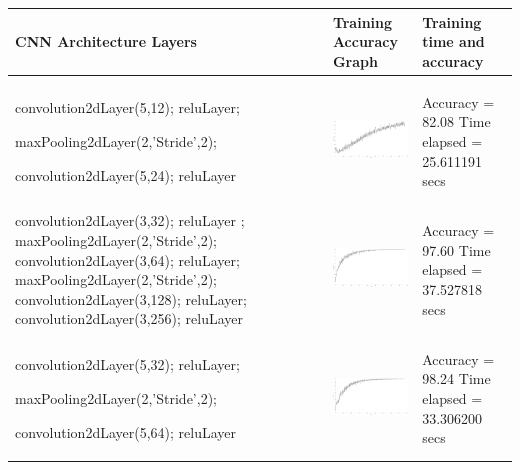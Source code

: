 \begin{table}[!htpb]
	\centering
	\begin{tabular}[t]{|>{\centering}p{6 cm}|p{4.8cm}|p{5.1cm}|}
		
		\cellcolor{blue!25}CNN Architecture Layers & \cellcolor{blue!25} Training Accuracy Graph& \cellcolor{blue!25} Training time and accuracy \\ \hline
		
			&&\\
		\vspace*{-2.8cm}
	convolution2dLayer(5,12);
	reluLayer;
	
	maxPooling2dLayer(2,'Stride',2);
	
	convolution2dLayer(5,24);
	reluLayer &  \includegraphics[height=3cm, width=4.4cm]{Exercise3/Report/accuracy_1_82} &  Accuracy = 82.08 \newline Time elapsed = 25.611191 secs\\ \hline
		
		&&\\
		\vspace*{-2.8cm}
	convolution2dLayer(3,32); reluLayer ; 	maxPooling2dLayer(2,'Stride',2); convolution2dLayer(3,64); reluLayer; maxPooling2dLayer(2,'Stride',2); convolution2dLayer(3,128); reluLayer;	
	convolution2dLayer(3,256);	reluLayer&  \includegraphics[height=3cm, width=4.4cm]{Exercise3/Report/accuracy_5_97_60} &  Accuracy = 97.60 \newline Time elapsed = 37.527818 secs\\ \hline
		
		&&\cellcolor{green!25} \\
		\vspace*{-2.8cm}
		convolution2dLayer(5,32);
		reluLayer;
		
		maxPooling2dLayer(2,'Stride',2);
		
		convolution2dLayer(5,64);
		reluLayer   &  \includegraphics[height=3cm, width=4.4cm]{Exercise3/Report/accuracy_3_97_68} &  \cellcolor{green!25} Accuracy = 98.24 \newline Time elapsed = 33.306200 secs\\ \hline
		

\end{tabular}
\end{table}
